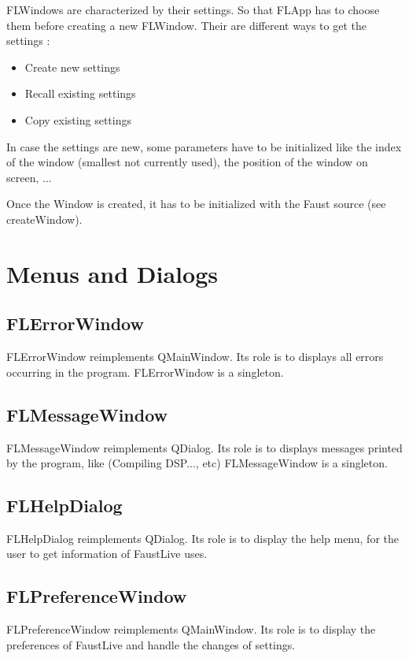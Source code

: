 \documentclass[a4paper]{article}
\begin{document}
FLWindows are characterized by their settings. So that FLApp has to choose them before creating a new FLWindow. Their are different ways to get the settings :

\begin{itemize}
\item Create new settings
\item Recall existing settings
\item Copy existing settings
\end{itemize}

In case the settings are new, some parameters have to be initialized like the index of the window (smallest not currently used), the position of the window on screen, ...

Once the Window is created, it has to be initialized with the Faust source (see createWindow).

\section{Menus and Dialogs}

\subsection{FLErrorWindow}

FLErrorWindow reimplements QMainWindow. Its role is to displays all errors occurring in the program.
FLErrorWindow is a singleton.

\subsection{FLMessageWindow}

FLMessageWindow reimplements QDialog. Its role is to displays messages printed by the program, like (Compiling DSP..., etc)
FLMessageWindow is a singleton.

\subsection{FLHelpDialog}

FLHelpDialog reimplements QDialog. Its role is to display the help menu, for the user to get information of FaustLive uses. 

\subsection{FLPreferenceWindow}

FLPreferenceWindow reimplements QMainWindow. Its role is to display the preferences of FaustLive and handle the changes of settings. 
\end{document}
